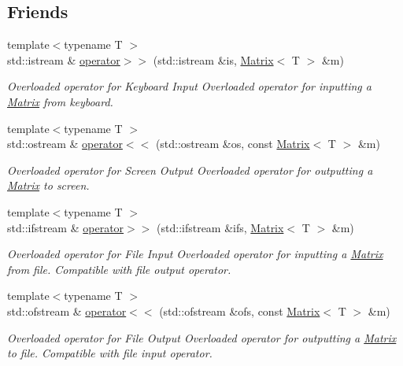 \subsection*{Friends}
\begin{DoxyCompactItemize}
\item 
{\footnotesize template$<$typename T $>$ }\\std\-::istream \& \hyperlink{class_matrix_aa2248e50c4fb5557a106c131be7d78fb}{operator$>$$>$} (std\-::istream \&is, \hyperlink{class_matrix}{Matrix}$<$ T $>$ \&m)
\begin{DoxyCompactList}\small\item\em Overloaded operator for Keyboard Input Overloaded operator for inputting a \hyperlink{class_matrix}{Matrix} from keyboard. \end{DoxyCompactList}\item 
{\footnotesize template$<$typename T $>$ }\\std\-::ostream \& \hyperlink{class_matrix_a2317d4101ee5164b72e47e21ca850856}{operator$<$$<$} (std\-::ostream \&os, const \hyperlink{class_matrix}{Matrix}$<$ T $>$ \&m)
\begin{DoxyCompactList}\small\item\em Overloaded operator for Screen Output Overloaded operator for outputting a \hyperlink{class_matrix}{Matrix} to screen. \end{DoxyCompactList}\item 
{\footnotesize template$<$typename T $>$ }\\std\-::ifstream \& \hyperlink{class_matrix_a8ee59afa5b1bdb68b1f468bcef8fb825}{operator$>$$>$} (std\-::ifstream \&ifs, \hyperlink{class_matrix}{Matrix}$<$ T $>$ \&m)
\begin{DoxyCompactList}\small\item\em Overloaded operator for File Input Overloaded operator for inputting a \hyperlink{class_matrix}{Matrix} from file. Compatible with file output operator. \end{DoxyCompactList}\item 
{\footnotesize template$<$typename T $>$ }\\std\-::ofstream \& \hyperlink{class_matrix_a110b2a51b42f5cda9c5ee6ffd13afcdb}{operator$<$$<$} (std\-::ofstream \&ofs, const \hyperlink{class_matrix}{Matrix}$<$ T $>$ \&m)
\begin{DoxyCompactList}\small\item\em Overloaded operator for File Output Overloaded operator for outputting a \hyperlink{class_matrix}{Matrix} to file. Compatible with file input operator. \end{DoxyCompactList}\end{DoxyCompactItemize}


